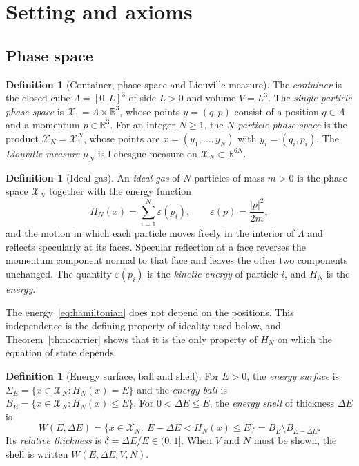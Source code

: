 \documentclass[11pt,a4paper]{article}
\theoremstyle{definition}
\newtheorem{definition}[theorem]{Definition}
\theoremstyle{remark}
\newcommand{\R}{\mathbb{R}}
\newcommand{\X}{\mathcal{X}}
\begin{document}
\section{Setting and axioms}
\label{sec:setting}

\subsection{Phase space}

\begin{definition}[Container, phase space and Liouville measure]
\label{def:phase}
The \emph{container} is the closed cube $\Lambda=[0,L]^{3}$ of side $L>0$ and volume $V=L^{3}$.
The \emph{single-particle phase space} is $\X_1=\Lambda\times\R^{3}$, whose points $y=(q,p)$ consist of a position $q\in\Lambda$ and a momentum $p\in\R^{3}$.
For an integer $N\ge1$, the \emph{$N$-particle phase space} is the product $\X_N=\X_1^{N}$, whose points are $x=(y_1,\dots,y_N)$ with $y_i=(q_i,p_i)$.
The \emph{Liouville measure} $\mu_N$ is Lebesgue measure on $\X_N\subset\R^{6N}$.
\end{definition}

\begin{definition}[Ideal gas]
\label{def:ideal}
An \emph{ideal gas} of $N$ particles of mass $m>0$ is the phase space $\X_N$ together with the energy function
\begin{equation}
H_N(x)=\sum_{i=1}^{N}\varepsilon(p_i),\qquad \varepsilon(p)=\frac{|p|^{2}}{2m},
\label{eq:hamiltonian}
\end{equation}
and the motion in which each particle moves freely in the interior of $\Lambda$ and reflects specularly at its faces.
Specular reflection at a face reverses the momentum component normal to that face and leaves the other two components unchanged.
The quantity $\varepsilon(p_i)$ is the \emph{kinetic energy} of particle $i$, and $H_N$ is the \emph{energy}.
\end{definition}

The energy~\eqref{eq:hamiltonian} does not depend on the positions.
This independence is the defining property of ideality used below, and Theorem~\ref{thm:carrier} shows that it is the only property of $H_N$ on which the equation of state depends.

\begin{definition}[Energy surface, ball and shell]
\label{def:shell}
For $E>0$, the \emph{energy surface} is $\Sigma_E=\{x\in\X_N:H_N(x)=E\}$ and the \emph{energy ball} is $B_E=\{x\in\X_N:H_N(x)\le E\}$.
For $0<\Delta E\le E$, the \emph{energy shell} of thickness $\Delta E$ is
\begin{equation}
W(E,\Delta E)=\{x\in\X_N:\ E-\Delta E<H_N(x)\le E\}=B_E\setminus B_{E-\Delta E}.
\label{eq:shell}
\end{equation}
Its \emph{relative thickness} is $\delta=\Delta E/E\in(0,1]$.
When $V$ and $N$ must be shown, the shell is written $W(E,\Delta E;V,N)$.
\end{definition}
\end{document}
